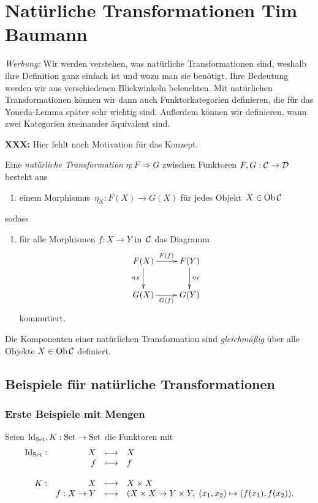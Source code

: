 \section[Natürliche Transformationen]{Natürliche Transformationen \hfill \small
Tim Baumann}

\emph{Werbung:} Wir werden verstehen, was natürliche Transformationen sind,
weshalb ihre Definition ganz einfach ist und wozu man sie benötigt. Ihre
Bedeutung werden wir aus verschiedenen Blickwinkeln beleuchten. Mit natürlichen
Transformationen können wir dann auch Funktorkategorien definieren, die für das
Yoneda-Lemma später sehr wichtig sind. Außerdem können wir definieren, wann
zwei Kategorien zueinander äquivalent sind.

\textbf{XXX:} Hier fehlt noch Motivation für das Konzept.

\begin{defn}Eine \emph{natürliche Transformation} $\eta : F \Rightarrow G$
zwischen Funktoren $F, G : \mathcal{C} \to \mathcal{D}$ besteht aus
\begin{enumerate}
\item[] einem Morphismus~$\eta_X : F(X) \to G(X)$ für jedes Objekt~$X \in \operatorname{Ob} \mathcal{C}$
\end{enumerate}
sodass
\begin{enumerate}
\item[]
für alle Morphismen $f : X \to Y$ in~$\mathcal{C}$ das Diagramm
\[ \xymatrix{
  F(X) \ar[r]^{F(f)} \ar[d]_{\eta_X} & F(Y) \ar[d]^{\eta_Y} \\
  G(X) \ar[r]_{G(f)} & G(Y)
} \]
kommutiert.
\end{enumerate}
\end{defn}

\begin{motto}
Die Komponenten einer natürlichen Transformation sind \emph{gleichmäßig} über
alle Objekte $X \in \operatorname{Ob}\mathcal{C}$ definiert.
\end{motto}


\subsection{Beispiele für natürliche Transformationen}


\subsubsection*{Erste Beispiele mit Mengen}

Seien $\mathrm{Id}_{\mathrm{Set}}, K: \mathrm{Set} \to \mathrm{Set}$ die Funktoren mit
\[ \begin{array}{@{}rrcl@{}}
  \Id_\Set: & X &\longmapsto& X \\
  & f &\longmapsto& f \\\\
  K: & X &\longmapsto& X \times X \\
  & f:X\to Y &\longmapsto& (X \times X \to Y \times Y,\ (x_1,x_2) \mapsto (f(x_1),f(x_2)).
\end{array} \]

